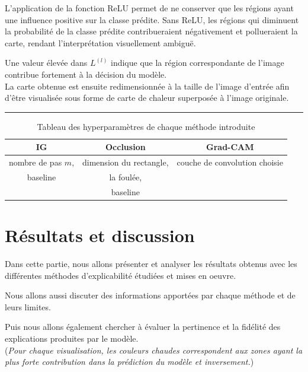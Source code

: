 \documentclass{ir}
\begin{document}
L'application de la fonction ReLU permet de ne conserver que les régions ayant une influence positive sur la classe prédite.
Sans ReLU, les régions qui diminuent la probabilité de la classe prédite contribueraient négativement et pollueraient la carte, rendant l'interprétation visuellement ambiguë.

Une valeur élevée dans $L^{(l)}$ indique que la région correspondante de l'image contribue fortement à la décision du modèle.\\

La carte obtenue est ensuite redimensionnée à la taille de l'image d'entrée afin d'être visualisée sous forme de carte de chaleur superposée à l'image originale.\\
\cite{selvaraju2017grad}

\hrule

\begin{table}[h]
    \centering
    \caption{Tableau des hyperparamètres de chaque méthode introduite}

    \begin{tabular}{|c|c|c|}
        \hline
        IG & Occlusion & Grad-CAM \\
        \hline
        nombre de pas $m$, & dimension du rectangle, & couche de convolution choisie \\
        baseline & la foulée, & \\
        & baseline & \\
        \hline
    \end{tabular}
\end{table}


\section{Résultats et discussion}

Dans cette partie, nous allons présenter et analyser les résultats obtenus avec les différentes méthodes d'explicabilité étudiées et mises en oeuvre.

Nous allons aussi discuter des informations apportées par chaque méthode et de leurs limites.

Puis nous allons également chercher à évaluer la pertinence et la fidélité des explications produites par le modèle.\\

(\textit{Pour chaque visualisation, les couleurs chaudes correspondent aux zones ayant la plus forte contribution dans la prédiction du modèle et inversement.})
\end{document}
